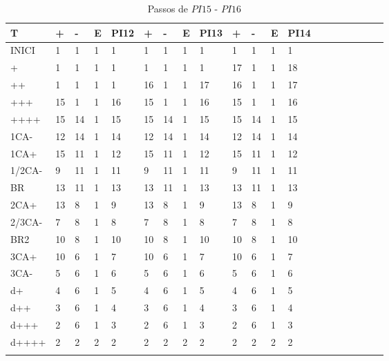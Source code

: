 \documentclass[12pt,a4paper]{report}
\begin{document}
\begin{table}[ht]
\caption{\label{tab:table-name} Passos de $PI15$ - $PI16$}
\centering
\begin{tabular}{ l l l l l l l l l l l l l l l l l l l l }
\hline
\hline
T      & +  & -  & E & PI12 & +  & -  & E & PI13 & +  & -  & E & PI14 &  &  &  &  &  &  &  \\ \hline
INICI  & 1  & 1  & 1 & 1    & 1  & 1  & 1 & 1    & 1  & 1  & 1 & 1    &  &  &  &  &  &  &  \\
+      & 1  & 1  & 1 & 1    & 1  & 1  & 1 & 1    & 17 & 1  & 1 & 18   &  &  &  &  &  &  &  \\
++     & 1  & 1  & 1 & 1    & 16 & 1  & 1 & 17   & 16 & 1  & 1 & 17   &  &  &  &  &  &  &  \\
+++    & 15 & 1  & 1 & 16   & 15 & 1  & 1 & 16   & 15 & 1  & 1 & 16   &  &  &  &  &  &  &  \\
++++   & 15 & 14 & 1 & 15   & 15 & 14 & 1 & 15   & 15 & 14 & 1 & 15   &  &  &  &  &  &  &  \\
1CA-   & 12 & 14 & 1 & 14   & 12 & 14 & 1 & 14   & 12 & 14 & 1 & 14   &  &  &  &  &  &  &  \\
1CA+   & 15 & 11 & 1 & 12   & 15 & 11 & 1 & 12   & 15 & 11 & 1 & 12   &  &  &  &  &  &  &  \\
1/2CA- & 9  & 11 & 1 & 11   & 9  & 11 & 1 & 11   & 9  & 11 & 1 & 11   &  &  &  &  &  &  &  \\
BR     & 13 & 11 & 1 & 13   & 13 & 11 & 1 & 13   & 13 & 11 & 1 & 13   &  &  &  &  &  &  &  \\
2CA+   & 13 & 8  & 1 & 9    & 13 & 8  & 1 & 9    & 13 & 8  & 1 & 9    &  &  &  &  &  &  &  \\
2/3CA- & 7  & 8  & 1 & 8    & 7  & 8  & 1 & 8    & 7  & 8  & 1 & 8    &  &  &  &  &  &  &  \\
BR2    & 10 & 8  & 1 & 10   & 10 & 8  & 1 & 10   & 10 & 8  & 1 & 10   &  &  &  &  &  &  &  \\
3CA+   & 10 & 6  & 1 & 7    & 10 & 6  & 1 & 7    & 10 & 6  & 1 & 7    &  &  &  &  &  &  &  \\
3CA-   & 5  & 6  & 1 & 6    & 5  & 6  & 1 & 6    & 5  & 6  & 1 & 6    &  &  &  &  &  &  &  \\
d+     & 4  & 6  & 1 & 5    & 4  & 6  & 1 & 5    & 4  & 6  & 1 & 5    &  &  &  &  &  &  &  \\
d++    & 3  & 6  & 1 & 4    & 3  & 6  & 1 & 4    & 3  & 6  & 1 & 4    &  &  &  &  &  &  &  \\
d+++   & 2  & 6  & 1 & 3    & 2  & 6  & 1 & 3    & 2  & 6  & 1 & 3    &  &  &  &  &  &  &  \\
d++++  & 2  & 2  & 2 & 2    & 2  & 2  & 2 & 2    & 2  & 2  & 2 & 2    &  &  &  &  &  &  &  \\
       &    &    &   &      &    &    &   &      &    &    &   &      &  &  &  &  &  &  & \\
       \hline
\end{tabular}
\end{table}
\end{document}
